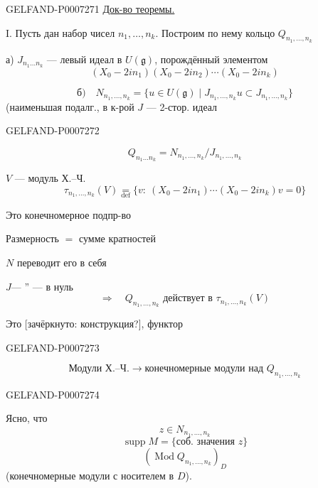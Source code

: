 \begin{GelfandAdjacentEvidence}{GELFAND-P000727}{1}
\underline{Док-во теоремы.}

I. Пусть дан набор чисел \(n_1,\ldots,n_k\). Построим по нему кольцо \(Q_{n_1,\ldots,n_k}\)

а) \(J_{n_1\ldots n_k}\) --- левый идеал в \(U(\mathfrak g)\), порождённый элементом
\[
(X_0-2in_1)(X_0-2in_2)\cdots(X_0-2in_k)
\]

\[
\text{б)}\quad
N_{n_1,\ldots,n_k}=
\{u\in U(\mathfrak g)\mid
J_{n_1,\ldots,n_k}u\subset J_{n_1,\ldots,n_k}\}
\]
(наименьшая подалг., в к-рой \(J\) --- 2-стор. идеал
\end{GelfandAdjacentEvidence}
\begin{GelfandAdjacentEvidence}{GELFAND-P000727}{2}


\[
Q_{n_1\ldots n_k}=N_{n_1,\ldots,n_k}/J_{n_1,\ldots,n_k}
\]

\quad \(V\) --- модуль Х.--Ч.
\[
\tau_{n_1,\ldots,n_k}(V)\underset{\mathrm{def}}{=}
\{v:\ (X_0-2in_1)\cdots(X_0-2in_k)v=0\}
\]

Это конечномерное подпр-во

Размерность \(={}\) сумме кратностей

\(N\) переводит его в себя

\(J\)\quad --- '' --- \quad в нуль
\[
\Rightarrow\quad Q_{n_1,\ldots,n_k}\text{ действует в }\tau_{n_1,\ldots,n_k}(V)
\]

Это [зачёркнуто: конструкция?], функтор
\end{GelfandAdjacentEvidence}
\begin{GelfandAdjacentEvidence}{GELFAND-P000727}{3}

\[
\text{Модули Х.--Ч.}\longrightarrow
\text{конечномерные модули над }Q_{n_1,\ldots,n_k}
\]
\end{GelfandAdjacentEvidence}
\begin{GelfandAdjacentEvidence}{GELFAND-P000727}{4}


Ясно, что
\[
z\in N_{n_1,\ldots,n_k}
\]
\[
\operatorname{supp} M=\{\text{соб. значения }z\}
\]
\[
(\operatorname{Mod} Q_{n_1,\ldots,n_k})_D
\]
(конечномерные модули с носителем в \(D\)).

\end{GelfandAdjacentEvidence}


